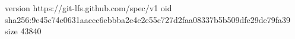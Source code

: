 version https://git-lfs.github.com/spec/v1
oid sha256:9e45c74e0631aaccc6ebbba2e4c2e55c727d2faa08337b5b509dfe29de79fa39
size 43840
